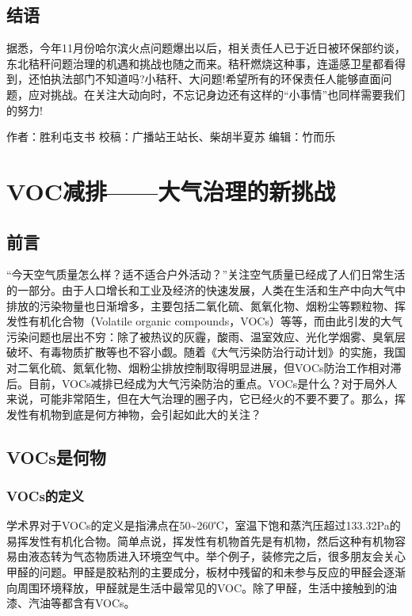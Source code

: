 \documentclass[]{book}
\begin{document}
\subsection{结语}

据悉，今年11月份哈尔滨火点问题爆出以后，相关责任人已于近日被环保部约谈，东北秸秆问题治理的机遇和挑战也随之而来。秸秆燃烧这种事，连遥感卫星都看得到，还怕执法部门不知道吗?小秸秆、大问题!希望所有的环保责任人能够直面问题，应对挑战。在关注大动向时，不忘记身边还有这样的``小事情''也同样需要我们的努力!

作者：胜利屯支书 校稿：广播站王站长、柴胡半夏苏 编辑：竹而乐

\section{VOC减排------大气治理的新挑战}\label{voc}

\subsection{前言}\label{-1}

``今天空气质量怎么样？适不适合户外活动？''关注空气质量已经成了人们日常生活的一部分。由于人口增长和工业及经济的快速发展，人类在生活和生产中向大气中排放的污染物量也日渐增多，主要包括二氧化硫、氮氧化物、烟粉尘等颗粒物、挥发性有机化合物（Volatile
organic
compounds，VOCs）等等，而由此引发的大气污染问题也层出不穷：除了被热议的灰霾，酸雨、温室效应、光化学烟雾、臭氧层破坏、有毒物质扩散等也不容小觑。随着《大气污染防治行动计划》的实施，我国对二氧化硫、氮氧化物、烟粉尘排放控制取得明显进展，但VOCs防治工作相对滞后。目前，VOCs减排已经成为大气污染防治的重点。VOCs是什么？对于局外人来说，可能非常陌生，但在大气治理的圈子内，它已经火的不要不要了。那么，挥发性有机物到底是何方神物，会引起如此大的关注？

\subsection{VOCs是何物}\label{vocs}

\subsubsection{VOCs的定义}\label{vocs}

学术界对于VOCs的定义是指沸点在50\textasciitilde{}260℃，室温下饱和蒸汽压超过133.32Pa的易挥发性有机化合物。简单点说，挥发性有机物首先是有机物，然后这种有机物容易由液态转为气态物质进入环境空气中。举个例子，装修完之后，很多朋友会关心甲醛的问题。甲醛是胶粘剂的主要成分，板材中残留的和未参与反应的甲醛会逐渐向周围环境释放，甲醛就是生活中最常见的VOC。除了甲醛，生活中接触到的油漆、汽油等都含有VOCs。
\end{document}
